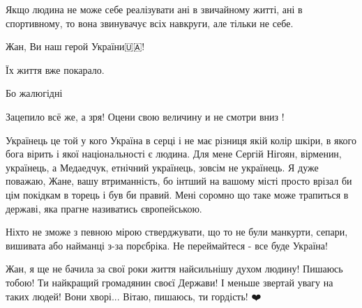 \begin{itemize}
Якщо людина не може себе реалізувати ані в звичайному житті, ані в спортивному,
то вона звинувачує всіх навкруги, але тільки не себе.

Жан, Ви наш герой України🇺🇦!

Їх життя вже покарало.

Бо жалюгідні

 
Зацепило всё же, а зря! Оцени свою величину и не смотри вниз !

 

Українець це той у кого Україна в серці і не має різниця якій колір шкіри, в
якого бога вірить і якої національності є людина. Для мене Сергій Нігоян,
вірменин, українець, а Медаедчук, етнічний українець, зовсім не українець. Я
дуже поважаю, Жане, вашу втриманність, бо інтший на вашому місті просто врізал
би цім покідкам в торець і був би правий. Мені соромно що таке може трапиться в
державі, яка прагне називатись європейською.

 

Ніхто не зможе з певною мірою стверджувати, що то не були манкурти, сепари,
вишивата або найманці з-за порєбріка. Не переймайтеся - все буде Україна!


 

Жан, я ще не бачила за свої роки життя найсильнішу духом людину! Пишаюсь тобою!
Ти найкращий громадянин своєї Держави! І меньше звертай увагу на таких людей!
Вони хворі... Вітаю, пишаюсь, ти гордість! ❤️


 


\end{itemize}
